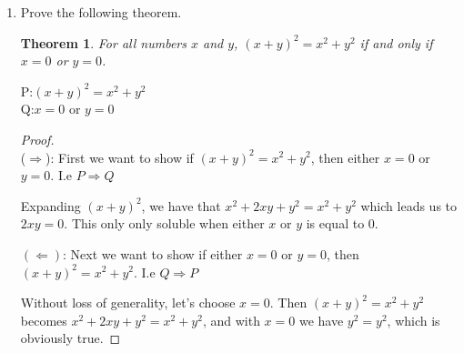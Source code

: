 \documentclass{article} %
\theoremstyle{plain}
\newtheorem*{theorem*}{Theorem}
\theoremstyle{case}
\begin{document}
\begin{enumerate}[label={\fbox{\textbf{Exercise \#\arabic* :}}}]
$P = x^2$ is an even integer\\
$Q = x$ is even

\begin{proof}[\textbf{Proof by contrapositive}]  We want to show that if
  $x$ is not even, then $x^2$ is not even.
  I.e, $\neg Q \Rightarrow \neg  P$

  If $x$ is not even, then it is odd and can be expressed as $x = 2k+1$
  for some integer $k$.  $x^2$ then, is $(2k+1)^2$, or $4k^2 + 4k + 1$.
  Let $w = 2(2k^2 + 2k) + 1$, then $w$ is odd and we have shown that if
  $x$ is not even, then $x^2$ is not even. 

\end{proof} 

\renewcommand\qedsymbol{\Lightning}
\begin{proof}[\textbf{Proof by contradiction}]  Towards a contradiction,
  Let's assume that $x$ is odd and $x^2$ is even.  We want to show this
  leads to a contradiction.  I.e. $\neg Q \wedge P \Rightarrow \neg P$

  Since $x$ is odd we can find an integer $k$ such that $x = 2k + 1$. Then 
  $x^2 = 4k^2 + 4k + 1$, which is equal to $2(k^2 + 2k) + 1$, but that's
  an odd number and we said that $x^2$ is even!
\end{proof} 
\renewcommand\qedsymbol{$\square$}

\newpage
\item Prove the following theorem. 

\begin{theorem*}
For all numbers $x$ and $y$,  $(x+y)^2=x^2+y^2$ if and only if $x=0$ or $y=0$. 
\end{theorem*}

P:$ (x+y)^2=x^2+y^2$ \\
Q:$ x=0 \text{ or } y=0$

\begin{proof}
~\\
  ($\Rightarrow$): First we want to show  if $(x+y)^2 = x^2 + y^2$, then
  either $x=0$ or $y=0$.  I.e $P \Rightarrow Q$

  Expanding $(x+y)^2$, we have that $x^2 + 2xy + y^2 = x^2 + y^2$ which leads us to
  $2xy = 0$.  This only only soluble when either $x$ or $y$ is equal to 0. 

  $(\Longleftarrow)$: Next we want to show if either $x=0$ or $y=0$, then
  $(x+y)^2 = x^2 + y^2$.  I.e $Q \Rightarrow P$

   Without loss of generality, let's choose $x=0$.  Then
   $(x+y)^2 = x^2 + y^2$ becomes $x^2 + 2xy + y^2 = x^2 + y^2$,
   and with $x=0$ we have $y^2 = y^2$, which is obviously true.
\end{proof}


\end{enumerate}
\end{document}
